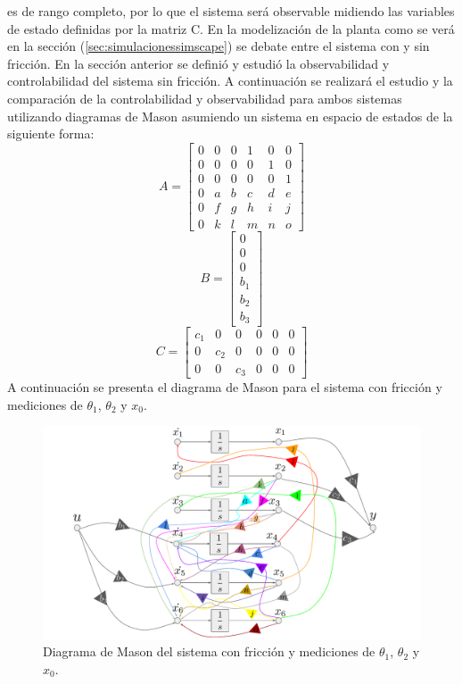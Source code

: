 es de rango completo, por lo que el sistema será observable midiendo las variables de estado definidas por la matriz C.
En la modelización de la planta como se verá en la sección (\ref{sec:simulacionessimscape}) se debate entre el sistema con y sin fricción.
En la sección anterior se definió y estudió la observabilidad y controlabilidad del sistema sin fricción. A continuación se realizará el estudio y la comparación de la controlabilidad y observabilidad para ambos sistemas utilizando diagramas de Mason asumiendo un sistema en espacio de estados de la siguiente forma:
\begin{equation}
 A = \begin{bmatrix}
0 &  0 & 0 & 1 &  0 & 0\\
0 &  0 & 0 & 0 &  1 & 0\\
0 &  0 & 0 & 0 &  0 & 1\\
0 &  a & b & c &  d & e\\
0 &  f & g & h &  i & j\\
0 &  k & l & m &  n & o
\end{bmatrix}
\end{equation}
\begin{equation}
 B = \begin{bmatrix}
0 \\
0 \\
0 \\
b_1 \\
b_2 \\
b_3 
\end{bmatrix}
\end{equation}
\begin{equation}
C = 	\begin{bmatrix}
c_1 & 0 & 0 & 0 & 0 & 0\\
0 & c_2 & 0 & 0 & 0 & 0\\
0 & 0 & c_3 & 0 & 0 & 0
\end{bmatrix}
\end{equation}
A continuación se presenta el diagrama de Mason para el sistema con fricción y mediciones de $\theta_1$, $\theta_2$ y $x_0$.
\begin{figure}[H]
	\centering
	\includegraphics[width=1\linewidth,page = 1]{../Modelo Teorico/ImagenesModelo Teorico/Mason.pdf}
	\caption{Diagrama de Mason del sistema con fricción y mediciones de $\theta_1$, $\theta_2$ y $x_0$.}	
	\label{fig:masonsisfyxomf}
\end{figure}

